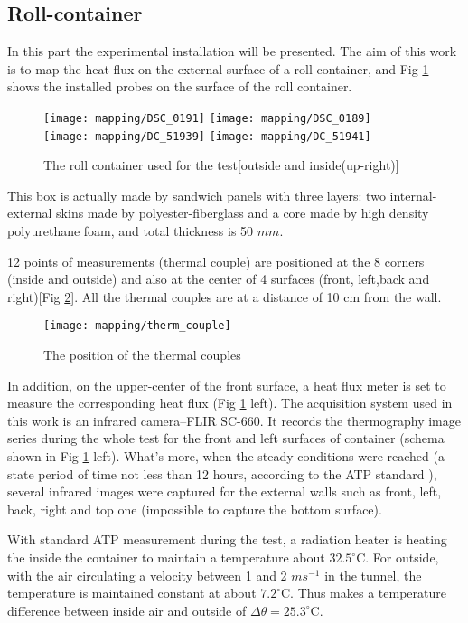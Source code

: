 \subsection{Roll-container}
In this part the experimental installation will be presented. The aim of this work is to map the heat flux on the external surface of a roll-container, and Fig \ref{box} shows the installed probes on the surface of the roll container.

\begin{figure}[!htbp]
	\centering
	\texttt{[image: mapping/DSC\_0191]}
	\texttt{[image: mapping/DSC\_0189]}\\
	\vspace{4pt}
	\texttt{[image: mapping/DC\_51939]}
	\texttt{[image: mapping/DC\_51941]}
	\caption{The roll container used for the test[outside and inside(up-right)]}
	\label{box}
\end{figure}

This box is actually made by sandwich panels with three layers: two internal-external skins made by polyester-fiberglass and a core made by high density polyurethane foam, and total thickness is 50 $mm$. \label{box_detail}

12 points of measurements (thermal couple) are positioned at the 8 corners (inside and outside) and also at the center of 4 surfaces (front, left,back and right)[Fig \ref{therm_couple}]. All the thermal couples are at a distance of 10 cm from the wall.
\begin{figure}[!htbp]
	\centering
	\texttt{[image: mapping/therm\_couple]}
	\caption{The position of the thermal couples}
	\label{therm_couple}
\end{figure}
In addition, on the upper-center of the front surface, a heat flux meter is set to measure the corresponding heat flux (Fig \ref{box} left). The acquisition system used in this work is an infrared camera--FLIR SC-660. It records the thermography image series during the whole test for the front and left surfaces of container (schema shown in Fig \ref{box} left). What's more, when the steady conditions were reached (a state period of time not less than 12 hours, according to the ATP standard \citep{rossi2009k}), several infrared images were captured for the external walls such as front, left, back, right and top one (impossible to capture the bottom surface). 

With standard ATP measurement during the test, a radiation heater is heating the inside the container to maintain a temperature about $32.5^{\circ}$C. For outside, with the air circulating a velocity between 1 and 2 $m s^{-1}$ in the tunnel, the temperature is maintained constant at about $7.2^{\circ}$C. Thus makes a temperature difference between inside air and outside of $\Delta \theta = 25.3^{\circ}$C.

